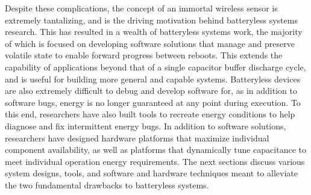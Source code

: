 Despite these complications, the concept of an immortal wireless sensor is extremely tantalizing, and is the driving motivation behind batteryless systems research.
This has resulted in a wealth of batteryless systems work, the majority of which is focused on developing software solutions that manage and preserve volatile state to enable forward progress between reboots.
This extends the capability of applications beyond that of a single capacitor buffer discharge cycle, and is useful for building more general and capable systems.
Batteryless devices are also extremely difficult to debug and develop software for, as in addition to software bugs, energy is no longer guaranteed at any point during execution.
To this end, researchers have also built tools to recreate energy conditions to help diagnose and fix intermittent energy bugs.
In addition to software solutions, researchers have designed hardware platforms that maximize individual component availability, as well as platforms that dynamically tune capacitance to meet individual operation energy requirements.
The next sections discuss various system designs, tools, and software and hardware techniques meant to alleviate the two fundamental drawbacks to batteryless systems.


